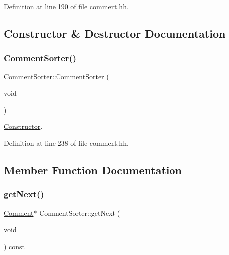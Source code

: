 Definition at line 190 of file comment.\+hh.



\subsection{Constructor \& Destructor Documentation}
\mbox{\label{class_comment_sorter_a095e90b97c4d14311b48c485e968ddd1}} 
\subsubsection{\texorpdfstring{CommentSorter()}{CommentSorter()}}
{\footnotesize\ttfamily Comment\+Sorter\+::\+Comment\+Sorter (\begin{DoxyParamCaption}\item[{void}]{ }\end{DoxyParamCaption})\hspace{0.3cm}{\ttfamily [inline]}}



\mbox{\hyperlink{class_constructor}{Constructor}}. 



Definition at line 238 of file comment.\+hh.



\subsection{Member Function Documentation}
\mbox{\label{class_comment_sorter_ad9ce1258fc843f1ddf0db5383073401a}} 
\subsubsection{\texorpdfstring{getNext()}{getNext()}}
{\footnotesize\ttfamily \mbox{\hyperlink{class_comment}{Comment}}$\ast$ Comment\+Sorter\+::get\+Next (\begin{DoxyParamCaption}\item[{void}]{ }\end{DoxyParamCaption}) const\hspace{0.3cm}{\ttfamily [inline]}}



